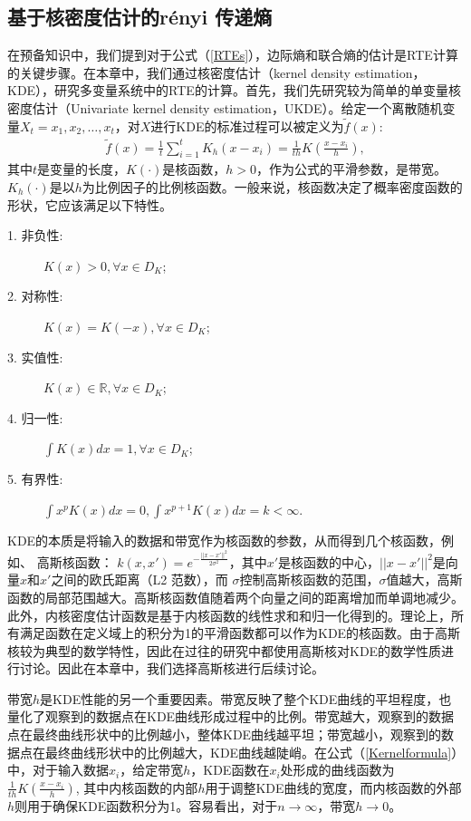 \subsection{基于核密度估计的r\'enyi 传递熵}
在预备知识中，我们提到对于公式（\ref{RTEs}），边际熵和联合熵的估计是RTE计算的关键步骤。在本章中，我们通过核密度估计（kernel density estimation，KDE），研究多变量系统中的RTE的计算。首先，我们先研究较为简单的单变量核密度估计（Univariate kernel density estimation，UKDE）。给定一个离散随机变量$X_{t}=x_{1}, x_{2}, \ldots, x_{t}$，对$X$进行KDE的标准过程可以被定义为$\tilde{f}(x)$:
\begin{align}\label{Kernelformula}
\tilde{f}(x) =\frac{1}{t}\sum\limits^{t}_{i=1}K_{h}(x-x_{i})
            =\frac{1}{th}K\left(\frac{x-x_{i}}{h}\right),
\end{align}
其中$t$是变量的长度，$K(\cdot)$是核函数，$h>0$，作为公式的平滑参数，是带宽。$K_{h}(\cdot)$是以$h$为比例因子的比例核函数。一般来说，核函数决定了概率密度函数的形状，它应该满足以下特性。
\begin{description}
  \item[1. 非负性:] $K(x)>0, \forall x \in D_{K}$;
  \item[2. 对称性:] $K(x) = K(-x), \forall x \in D_{K}$;
  \item[3. 实值性:] $K(x) \in \mathbb R, \forall x \in D_{K}$;
  \item[4. 归一性:] $ \int K(x) dx = 1, \forall x \in D_{K}$;
  \item[5. 有界性:] $\int x^{p}K(x)dx = 0, \int x^{p+1}K(x)dx = k < \infty$.
\end{description}

KDE的本质是将输入的数据和带宽作为核函数的参数，从而得到几个核函数，例如、 高斯核函数： $k(x,x')=e^{-\frac{||x-x'||^{2}}{2\sigma^{2}}}$，其中$x'$是核函数的中心，$||x-x'||^{2}$是向量$x$和$x'$之间的欧氏距离（L2 范数），而 $\sigma$控制高斯核函数的范围，$\sigma$值越大，高斯函数的局部范围越大。高斯核函数值随着两个向量之间的距离增加而单调地减少。此外，内核密度估计函数是基于内核函数的线性求和和归一化得到的。理论上，所有满足函数在定义域上的积分为1的平滑函数都可以作为KDE的核函数。由于高斯核较为典型的数学特性，因此在过往的研究中都使用高斯核对KDE的数学性质进行讨论。因此在本章中，我们选择高斯核进行后续讨论。

带宽$h$是KDE性能的另一个重要因素。带宽反映了整个KDE曲线的平坦程度，也量化了观察到的数据点在KDE曲线形成过程中的比例。带宽越大，观察到的数据点在最终曲线形状中的比例越小，整体KDE曲线越平坦；带宽越小，观察到的数据点在最终曲线形状中的比例越大，KDE曲线越陡峭。在公式（\ref{Kernelformula}）中，对于输入数据$x_{i}$，给定带宽$h$，KDE函数在$x_{i}$处形成的曲线函数为 $\frac{1}{th}K(\frac{x-x_{i}}{h})$, 其中内核函数的内部$h$用于调整KDE曲线的宽度，而内核函数的外部$h$则用于确保KDE函数积分为1。容易看出，对于$n\rightarrow \infty$，带宽$h\rightarrow 0$。

